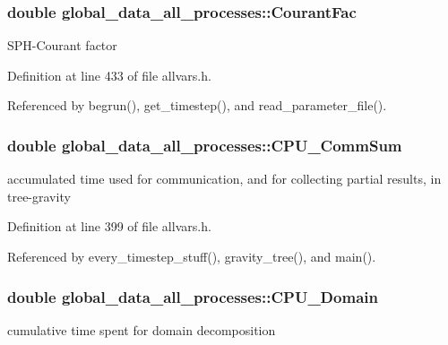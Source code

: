 \hypertarget{structglobal__data__all__processes_aa4cf405da4e0a6fc588f5a5ba7e8fde8}{
\subsubsection[{CourantFac}]{\setlength{\rightskip}{0pt plus 5cm}double {\bf global\_\-data\_\-all\_\-processes::CourantFac}}}
\label{structglobal__data__all__processes_aa4cf405da4e0a6fc588f5a5ba7e8fde8}
SPH-\/Courant factor 

Definition at line 433 of file allvars.h.



Referenced by begrun(), get\_\-timestep(), and read\_\-parameter\_\-file().

\hypertarget{structglobal__data__all__processes_a41ab81d126219e1ff8119f8400428216}{
\subsubsection[{CPU\_\-CommSum}]{\setlength{\rightskip}{0pt plus 5cm}double {\bf global\_\-data\_\-all\_\-processes::CPU\_\-CommSum}}}
\label{structglobal__data__all__processes_a41ab81d126219e1ff8119f8400428216}
accumulated time used for communication, and for collecting partial results, in tree-\/gravity 

Definition at line 399 of file allvars.h.



Referenced by every\_\-timestep\_\-stuff(), gravity\_\-tree(), and main().

\hypertarget{structglobal__data__all__processes_a786736d9e91341733e286f6e03ab26a5}{
\subsubsection[{CPU\_\-Domain}]{\setlength{\rightskip}{0pt plus 5cm}double {\bf global\_\-data\_\-all\_\-processes::CPU\_\-Domain}}}
\label{structglobal__data__all__processes_a786736d9e91341733e286f6e03ab26a5}
cumulative time spent for domain decomposition 

